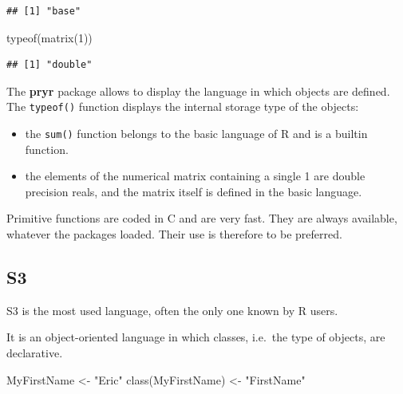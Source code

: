 \documentclass[
  12pt,
  american,
  a4paper,
  extrafontsizes,onecolumn,openright
  ]{memoir}
\newenvironment{Shaded}{\begin{snugshade}}{\end{snugshade}}
\newcommand{\DecValTok}[1]{\textcolor[rgb]{0.00,0.00,0.81}{#1}}
\newcommand{\FunctionTok}[1]{\textcolor[rgb]{0.00,0.00,0.00}{#1}}
\newcommand{\NormalTok}[1]{#1}
\newcommand{\OtherTok}[1]{\textcolor[rgb]{0.56,0.35,0.01}{#1}}
\newcommand{\StringTok}[1]{\textcolor[rgb]{0.31,0.60,0.02}{#1}}
\providecommand{\tightlist}{%
  \setlength{\itemsep}{0pt}\setlength{\parskip}{0pt}}
\begin{document}
\begin{verbatim}
## [1] "base"
\end{verbatim}

\begin{Shaded}
\begin{Highlighting}[]
\FunctionTok{typeof}\NormalTok{(}\FunctionTok{matrix}\NormalTok{(}\DecValTok{1}\NormalTok{))}
\end{Highlighting}
\end{Shaded}

\begin{verbatim}
## [1] "double"
\end{verbatim}

\normalsize

The \textbf{pryr} package allows to display the language in which objects are defined.
The \texttt{typeof()} function displays the internal storage type of the objects:

\begin{itemize}
\tightlist
\item
  the \texttt{sum()} function belongs to the basic language of R and is a builtin function.
\item
  the elements of the numerical matrix containing a single 1 are double precision reals, and the matrix itself is defined in the basic language.
\end{itemize}

Primitive functions are coded in C and are very fast.
They are always available, whatever the packages loaded.
Their use is therefore to be preferred.

\hypertarget{sec:S3}{%
\subsection{S3}\label{sec:S3}}

S3 is the most used language, often the only one known by R users.

It is an object-oriented language in which classes, i.e.~the type of objects, are declarative.

\scriptsize

\begin{Shaded}
\begin{Highlighting}[]
\NormalTok{MyFirstName }\OtherTok{\textless{}{-}} \StringTok{"Eric"}
\FunctionTok{class}\NormalTok{(MyFirstName) }\OtherTok{\textless{}{-}} \StringTok{"FirstName"}
\end{Highlighting}
\end{Shaded}
\end{document}
